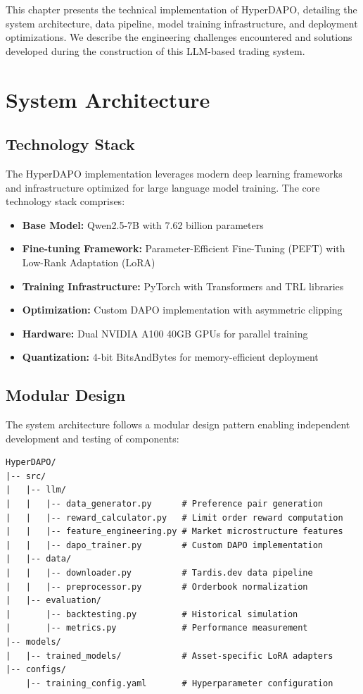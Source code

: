 \documentclass{report}
\begin{document}
This chapter presents the technical implementation of HyperDAPO, detailing the system architecture, data pipeline, model training infrastructure, and deployment optimizations. We describe the engineering challenges encountered and solutions developed during the construction of this LLM-based trading system.

\section{System Architecture}

\subsection{Technology Stack}

The HyperDAPO implementation leverages modern deep learning frameworks and infrastructure optimized for large language model training. The core technology stack comprises:

\begin{itemize}
    \item \textbf{Base Model:} Qwen2.5-7B \cite{Qwen2024} with 7.62 billion parameters
    \item \textbf{Fine-tuning Framework:} Parameter-Efficient Fine-Tuning (PEFT) with Low-Rank Adaptation (LoRA)
    \item \textbf{Training Infrastructure:} PyTorch with Transformers and TRL libraries
    \item \textbf{Optimization:} Custom DAPO implementation with asymmetric clipping
    \item \textbf{Hardware:} Dual NVIDIA A100 40GB GPUs for parallel training
    \item \textbf{Quantization:} 4-bit BitsAndBytes for memory-efficient deployment
\end{itemize}

\subsection{Modular Design}

The system architecture follows a modular design pattern enabling independent development and testing of components:

\begin{verbatim}
HyperDAPO/
|-- src/
|   |-- llm/
|   |   |-- data_generator.py      # Preference pair generation
|   |   |-- reward_calculator.py   # Limit order reward computation
|   |   |-- feature_engineering.py # Market microstructure features
|   |   |-- dapo_trainer.py        # Custom DAPO implementation
|   |-- data/
|   |   |-- downloader.py          # Tardis.dev data pipeline
|   |   |-- preprocessor.py        # Orderbook normalization
|   |-- evaluation/
|       |-- backtesting.py         # Historical simulation
|       |-- metrics.py             # Performance measurement
|-- models/
|   |-- trained_models/            # Asset-specific LoRA adapters
|-- configs/
    |-- training_config.yaml       # Hyperparameter configuration
\end{verbatim}
\end{document}
